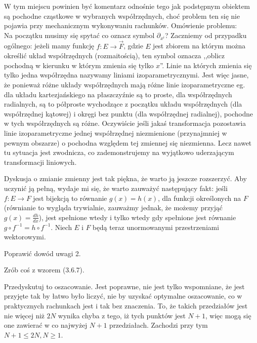 \documentclass[a4paper,11pt]{article}
\begin{document}
  
\start {} W tym miejscu powinien być komentarz odnośnie tego
jak podstępnym obiektem są pochodne cząstkowe w wybranych
współrzędnych, choć problem ten się nie pojawia przy mechanicznym
wykonywaniu rachunków.
Omówienie problemu: \\
Na początku musimy się spytać co oznacz symbol $\partial_{ x^{ i } }$?
Zaczniemy od przypadku ogólnego: jeżeli mamy funkcję
$f : E \to \vec{ F }$, gdzie $E$ jest zbiorem na którym można określić
układ współrzędnych (rozmaitością), ten symbol oznacza ,,oblicz
pochodną w kierunku w którym zmienia się tylko $x$''. Linie na których
zmienia się tylko jedna współrzędna nazywamy liniami
izoparametrycznymi. Jest więc jasne, że ponieważ różne układy
współrzędnych mają różne linie izoparametryczne eg. dla układu
kartezjańskiego na płaszczyźnie są to proste, dla współrzędnych
radialnych, są to półproste wychodzące z początku układu współrzędnych
(dla współrzędnej kątowej) i okręgi bez punktu (dla współrzędnej
radialnej), pochodne w tych współrzędnych są różne. Oczywiście jeśli
jakaś transformacja pozostawia linie izoparametryczne jednej
współrzędnej niezmienione (przynajmniej w pewnym obszarze) o pochodna
względem tej zmiennej się niezmienna. Lecz nawet tu sytuacja jest
zwodnicza, co zademonstrujemy na wyjątkowo uderzającym
transformacji liniowych. \\

\vspace{\spaceFour}


\start {} Dyskusja o zmianie zmienny jest tak piękna, że warto
ją jeszcze rozszerzyć. Aby uczynić ją pełną, wydaje mi się, że warto
zauważyć następujący fakt: jeśli $f : E \to F$ jest bijekcją to
równanie $g( x ) = h( x )$, dla funkcji określonych na $F$ (równianie
to wygląda trywialnie, zauważmy jednak, że możemy przyjąć
$g( x ) = \frac{ d h }{ d x }$), jest spełnione wtedy i tylko wtedy
gdy spełnione jest równanie $g \circ f^{ -1 } = h \circ f^{ -1 }$.
Niech $E$ i $F$ będą teraz unormowanymi przestrzeniami wektorowymi.

\vspace{\spaceFour}


\start {} Poprawić dowód uwagi 2.

\vspace{\spaceFour}

  
\start {} Zrób coś z wzorem (3.6.7).

\vspace{\spaceFour}

  
\start {} Przedyskutuj to oszacowanie. Jest poprawne, nie jest
tylko wspomniane, że jest przyjęte tak by łatwo było liczyć, nie by
uzyskać optymalne oszacowanie, co w praktycznych rachunkach jest i tak
bez znaczenia. To, że takich przedziałów jest nie więcej niż $2N$
wynika chyba z tego, iż tych punktów jest $N+1$, więc mogą się one
zawierać w co najwyżej $N + 1$ przedziałach. Zachodzi przy tym
$N + 1 \leq 2 N, N \geq 1$.
\end{document}
